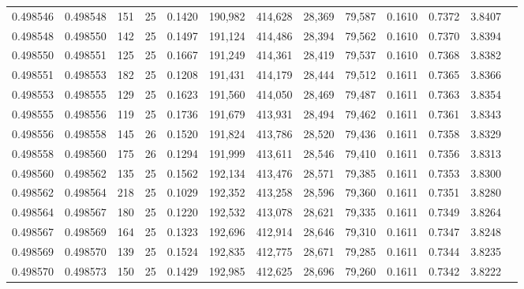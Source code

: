 \begin{tabular}{rrrrrrrrrrrrr}
0.498546 & 0.498548 & 151 &  25 &                                     0.1420 & 190,982 & 414,628 &  28,369 &  79,587 & 0.1610 & 0.7372 & 3.8407 \\
0.498548 & 0.498550 & 142 &  25 &                                     0.1497 & 191,124 & 414,486 &  28,394 &  79,562 & 0.1610 & 0.7370 & 3.8394 \\
0.498550 & 0.498551 & 125 &  25 &                                     0.1667 & 191,249 & 414,361 &  28,419 &  79,537 & 0.1610 & 0.7368 & 3.8382 \\
0.498551 & 0.498553 & 182 &  25 &                                     0.1208 & 191,431 & 414,179 &  28,444 &  79,512 & 0.1611 & 0.7365 & 3.8366 \\
0.498553 & 0.498555 & 129 &  25 &                                     0.1623 & 191,560 & 414,050 &  28,469 &  79,487 & 0.1611 & 0.7363 & 3.8354 \\
0.498555 & 0.498556 & 119 &  25 &                                     0.1736 & 191,679 & 413,931 &  28,494 &  79,462 & 0.1611 & 0.7361 & 3.8343 \\
0.498556 & 0.498558 & 145 &  26 &                                     0.1520 & 191,824 & 413,786 &  28,520 &  79,436 & 0.1611 & 0.7358 & 3.8329 \\
0.498558 & 0.498560 & 175 &  26 &                                     0.1294 & 191,999 & 413,611 &  28,546 &  79,410 & 0.1611 & 0.7356 & 3.8313 \\
0.498560 & 0.498562 & 135 &  25 &                                     0.1562 & 192,134 & 413,476 &  28,571 &  79,385 & 0.1611 & 0.7353 & 3.8300 \\
0.498562 & 0.498564 & 218 &  25 &                                     0.1029 & 192,352 & 413,258 &  28,596 &  79,360 & 0.1611 & 0.7351 & 3.8280 \\
0.498564 & 0.498567 & 180 &  25 &                                     0.1220 & 192,532 & 413,078 &  28,621 &  79,335 & 0.1611 & 0.7349 & 3.8264 \\
0.498567 & 0.498569 & 164 &  25 &                                     0.1323 & 192,696 & 412,914 &  28,646 &  79,310 & 0.1611 & 0.7347 & 3.8248 \\
0.498569 & 0.498570 & 139 &  25 &                                     0.1524 & 192,835 & 412,775 &  28,671 &  79,285 & 0.1611 & 0.7344 & 3.8235 \\
0.498570 & 0.498573 & 150 &  25 &                                     0.1429 & 192,985 & 412,625 &  28,696 &  79,260 & 0.1611 & 0.7342 & 3.8222 \\

\end{tabular}
